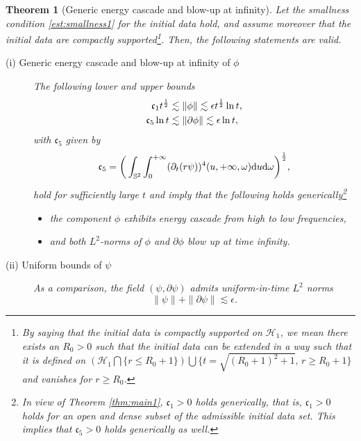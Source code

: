\documentclass[a4paper,reqno]{amsart}
\newtheorem{theorem}{Theorem}[section]
\theoremstyle{definition}
\numberwithin{equation}{section}
\def \d {{\rm{d}}}
\def\ep{\epsilon}
\begin{document}
\begin{theorem}[Generic energy cascade and blow-up at infinity]\label{thm:blow-up} 
Let the smallness condition \eqref{est:smallness1} for the initial data hold, and assume moreover that the initial data are compactly supported\footnote{By saying that the initial data is compactly supported on $\mathcal{H}_1$, we mean there exists an $R_0>0$ such that the initial data can be extended in a way such that it is defined on $(\mathcal{H}_1\bigcap \{ r\leq R_0+1 \})\bigcup \{t=\sqrt{(R_0 + 1)^2 + 1}, \, r\geq R_0 +1 \}$ and vanishes for $r\geq R_0$.}. Then, the following statements are valid.
 \begin{description}
\item [ (i) Generic energy cascade and blow-up at infinity of $\phi$]
         The following lower and upper bounds 
         \begin{equation}
         \begin{aligned}
              \mathfrak{c}_1 t^{1\over 2}&\lesssim \| \phi \| \lesssim \ep t^{\frac{1}{2}} \ln t,\\
              \mathfrak{c}_{5}\ln t&\lesssim \| \partial \phi \| \lesssim \epsilon \ln t,
              \end{aligned}
         \end{equation}
         with $\mathfrak{c}_5$ given by
         \begin{equation}
         \label{def:cfrak5constant}
    \mathfrak{c}_{5}=\bigg( \int_{\mathbb{S}^2} \int_0^{+\infty} (\partial_t(r\psi))^4(u,+\infty,\omega)\d u \d \omega \bigg)^{1\over 2},
\end{equation}
hold for sufficiently large $t$ and imply that the following holds generically\footnote{In view of Theorem \ref{thm:main1}, $\mathfrak{c}_1 > 0$ holds generically, that is, $\mathfrak{c}_1 > 0$ holds for an open and dense subset of the admissible initial data set. This implies that $\mathfrak{c}_5>0$ holds generically as well.} 
\begin{itemize}
    \item the component $\phi$ exhibits energy cascade from high to low frequencies,
    \item and both $L^2$-norms of $\phi$ and $\partial\phi$  blow up at time infinity.
\end{itemize} 

       \smallskip
 \item [ (ii) Uniform bounds of $\psi$]
As a comparison, the field $(\psi,\partial \psi)$ admits uniform-in-time $L^2$ norms
\begin{equation}
    \| \psi \| + \| \partial\psi \| \lesssim \epsilon.
\end{equation}
\end{description}
\end{theorem}
\end{document}
